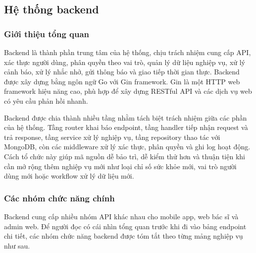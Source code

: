 \subsection{Hệ thống backend}

\subsubsection{Giới thiệu tổng quan}
\par Backend là thành phần trung tâm của hệ thống, chịu trách nhiệm cung cấp API, xác thực người dùng, phân quyền theo vai trò, quản lý dữ liệu nghiệp vụ, xử lý cảnh báo, xử lý nhắc nhở, gửi thông báo và giao tiếp thời gian thực. Backend được xây dựng bằng ngôn ngữ Go với Gin framework. Gin là một HTTP web framework hiệu năng cao, phù hợp để xây dựng RESTful API và các dịch vụ web có yêu cầu phản hồi nhanh. \cite{ginframework}

\par Backend được chia thành nhiều tầng nhằm tách biệt trách nhiệm giữa các phần của hệ thống. Tầng router khai báo endpoint, tầng handler tiếp nhận request và trả response, tầng service xử lý nghiệp vụ, tầng repository thao tác với MongoDB, còn các middleware xử lý xác thực, phân quyền và ghi log hoạt động. Cách tổ chức này giúp mã nguồn dễ bảo trì, dễ kiểm thử hơn và thuận tiện khi cần mở rộng thêm nghiệp vụ mới như loại chỉ số sức khỏe mới, vai trò người dùng mới hoặc workflow xử lý dữ liệu mới.


\subsubsection{Các nhóm chức năng chính}
\par Backend cung cấp nhiều nhóm API khác nhau cho mobile app, web bác sĩ và admin web. Để người đọc có cái nhìn tổng quan trước khi đi vào bảng endpoint chi tiết, các nhóm chức năng backend được tóm tắt theo từng mảng nghiệp vụ như sau.

